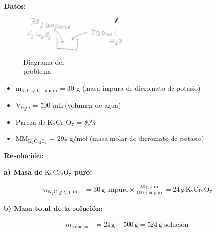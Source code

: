 \documentclass{article}
\begin{document}
\begin{multicols}{2} %
\noindent\textbf{Datos:} %

\begin{figure}[H]
    \begin{minipage}[t]{0.3\textwidth} %
        \raggedright %
        \includegraphics[width=\linewidth, height=2cm]{./problema3_diagrama.png} %
        \caption{Diagrama del \\ problema}
    \end{minipage}
\end{figure}

\textbf{} %
\begin{itemize}
\item m$_{\text{K}_2\text{Cr}_2\text{O}_7, \text{impuro}}$ = 30 g (masa impura de dicromato de potasio)
\item V$_{\text{H}_2\text{O}}$ = 500 mL (volumen de agua)
\item Pureza de $\text{K}_2\text{Cr}_2\text{O}_7$ = 80\%
\item MM$_{\text{K}_2\text{Cr}_2\text{O}_7}$ = 294 g/mol (masa molar de dicromato de potasio)
\end{itemize}

\columnbreak %

\noindent\textbf{Resolución:} %

\textbf{a) Masa de $\text{K}_2\text{Cr}_2\text{O}_7$ puro:}

\begin{align*}
    m_{\text{K}_2\text{Cr}_2\text{O}_7, \text{puro}} &= 30 \, \text{g impuro} \times \frac{80 \, \text{g puro}}{100 \, \text{g impuro}} = 24 \, \text{g} \, \text{K}_2\text{Cr}_2\text{O}_7
\end{align*}

\textbf{b) Masa total de la solución:}

\begin{align*}
    m_{\text{solución}} &= 24 \, \text{g} + 500 \, \text{g} = 524 \, \text{g solución}
\end{align*}


\end{multicols}
\end{document}
